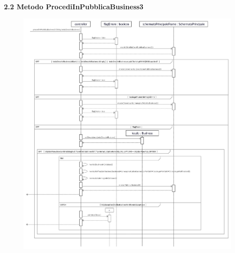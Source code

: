 \documentclass[a4paper,12pt]{article}
\begin{document}
\newpage\null{}\setcounter{page}{6}
\begin{flushleft}
\vspace*{+1cm}
{\bf\normalsize 2.2 Metodo ProcediInPubblicaBusiness3 }
\begin{center}
	\begin{figure}[h]
	\centering
 	\includegraphics[width=1\textwidth]{ProcediInPubblicaBusiness3.jpg}
	\end{figure}
\end{center}
\end{flushleft}
\newpage
\end{document}

